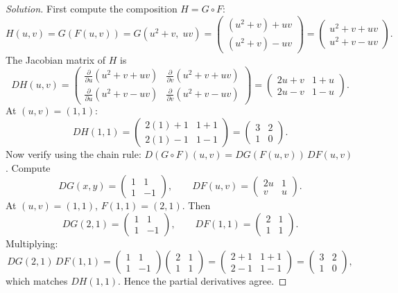 \documentclass{article}
\begin{document}
\begin{proof}[Solution]
	First compute the composition \(H=G\circ F\):
	\[
		H(u,v)=G(F(u,v))=G(u^2+v,\;uv)=\begin{pmatrix}(u^2+v)+uv \\ (u^2+v)-uv\end{pmatrix}
		=\begin{pmatrix}u^2+v+uv \\ u^2+v-uv\end{pmatrix}.
	\]
	The Jacobian matrix of \(H\) is
	\[
		DH(u,v)=\begin{pmatrix}
			\frac{\partial}{\partial u}(u^2+v+uv) & \frac{\partial}{\partial v}(u^2+v+uv) \\[4pt]
			\frac{\partial}{\partial u}(u^2+v-uv) & \frac{\partial}{\partial v}(u^2+v-uv)
		\end{pmatrix}
		=\begin{pmatrix}
			2u+v & 1+u \\
			2u-v & 1-u
		\end{pmatrix}.
	\]
	At \((u,v)=(1,1)\):
	\[
		DH(1,1)=\begin{pmatrix}
			2(1)+1 & 1+1 \\
			2(1)-1 & 1-1
		\end{pmatrix}
		=\begin{pmatrix}
			3 & 2 \\
			1 & 0
		\end{pmatrix}.
	\]
	Now verify using the chain rule: \(D(G\circ F)(u,v)=DG(F(u,v))\,DF(u,v)\). Compute
	\[
		DG(x,y)=\begin{pmatrix}
			1 & 1  \\
			1 & -1
		\end{pmatrix},\qquad
		DF(u,v)=\begin{pmatrix}
			2u & 1 \\
			v  & u
		\end{pmatrix}.
	\]
	At \((u,v)=(1,1)\), \(F(1,1)=(2,1)\). Then
	\[
		DG(2,1)=\begin{pmatrix}1&1\\1&-1\end{pmatrix},\qquad
		DF(1,1)=\begin{pmatrix}2&1\\1&1\end{pmatrix}.
	\]
	Multiplying:
	\[
		DG(2,1)\,DF(1,1)=\begin{pmatrix}1&1\\1&-1\end{pmatrix}\begin{pmatrix}2&1\\1&1\end{pmatrix}
		=\begin{pmatrix}2+1&1+1\\2-1&1-1\end{pmatrix}
		=\begin{pmatrix}3&2\\1&0\end{pmatrix},
	\]
	which matches \(DH(1,1)\). Hence the partial derivatives agree.
\end{proof}
\end{document}
